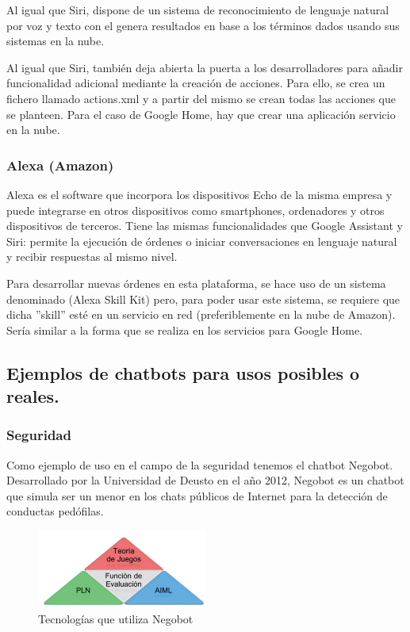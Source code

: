 \documentclass[spanish,12pt, a4paper, twoside]{paper}
\begin{document}
Al igual que Siri, dispone de un sistema de reconocimiento de lenguaje natural por voz y texto con el genera resultados en base a los términos dados usando sus sistemas en la nube.
\newline

Al igual que Siri, también deja abierta la puerta a los desarrolladores para añadir funcionalidad adicional mediante la creación de acciones. Para ello, se crea un fichero llamado actions.xml y a partir del mismo se crean todas las acciones que se planteen. Para el caso de Google Home, hay que crear una aplicación servicio en la nube.

\subsubsection{Alexa (Amazon)}

Alexa es el software que incorpora los dispositivos Echo de la misma empresa y puede integrarse en otros dispositivos como smartphones, ordenadores y otros dispositivos de terceros. Tiene las mismas funcionalidades que Google Assistant y Siri: permite la ejecución de órdenes o iniciar conversaciones en lenguaje natural y recibir respuestas al mismo nivel.
\newline

Para desarrollar nuevas órdenes en esta plataforma, se hace uso de un sistema denominado (Alexa Skill Kit) pero, para poder usar este sistema, se requiere que dicha ''skill'' esté en un servicio en red (preferiblemente en la nube de Amazon). Sería similar a la forma que se realiza en los servicios para Google Home.

\subsection{Ejemplos de chatbots para usos posibles o reales.}

\subsubsection{Seguridad}

Como ejemplo de uso en el campo de la seguridad tenemos el chatbot Negobot. Desarrollado por la Universidad de Deusto en el año 2012, Negobot es un chatbot que simula ser un menor en los chats públicos de Internet para la detección de conductas pedófilas.
\newline

\begin{figure}[h]
\centering
	\includegraphics[width=0.5\textwidth]{recursos/Negobot_tecnologia}
\caption{Tecnologías que utiliza Negobot}
\label{fig:Tecnologías de Negobot}
\end{figure}
\end{document}
